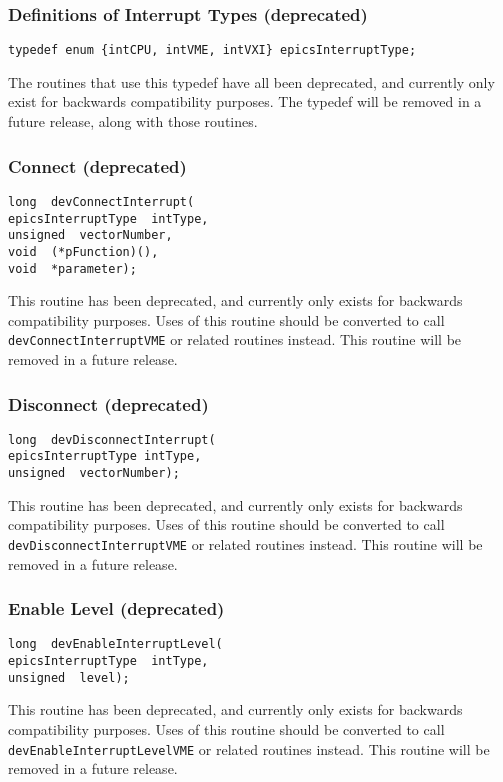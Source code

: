 \subsubsection{Definitions of Interrupt Types (deprecated)}

\begin{verbatim}typedef enum {intCPU, intVME, intVXI} epicsInterruptType;
\end{verbatim}The routines that use this typedef have all been deprecated, and currently only exist for backwards compatibility purposes. 
The typedef will be removed in a future release, along with those routines.

\subsubsection{Connect (deprecated)}

\begin{verbatim}long  devConnectInterrupt(
epicsInterruptType  intType,
unsigned  vectorNumber,
void  (*pFunction)(),
void  *parameter);
\end{verbatim}This routine has been deprecated, and currently only exists for backwards compatibility purposes. Uses of this routine 
should be converted to call \verb|devConnectInterruptVME| or related routines instead. This routine will be removed in a 
future release.

\subsubsection{Disconnect (deprecated)}

\begin{verbatim}long  devDisconnectInterrupt(
epicsInterruptType intType,
unsigned  vectorNumber);
\end{verbatim}This routine has been deprecated, and currently only exists for backwards compatibility purposes. Uses of this routine 
should be converted to call \verb|devDisconnectInterruptVME| or related routines instead. This routine will be removed 
in a future release.

\subsubsection{Enable Level (deprecated)}

\begin{verbatim}long  devEnableInterruptLevel(
epicsInterruptType  intType,
unsigned  level);
\end{verbatim}This routine has been deprecated, and currently only exists for backwards compatibility purposes. Uses of this routine 
should be converted to call \verb|devEnableInterruptLevelVME| or related routines instead. This routine will be removed 
in a future release.

